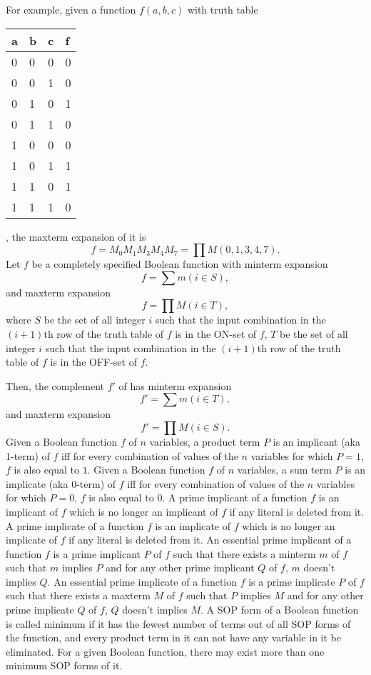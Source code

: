 \documentclass[a4paper,12pt]{article}
\begin{document}
\begin{itemize}
\begin{itemize}
\begin{itemize}
\begin{itemize}
\begin{itemize}
\begin{itemize}
\begin{itemize}
For example, given a function $f(a,b,c)$ with truth table
\begin{longtable}[c]{|m|m|m|m|}
\hline
a & b & c & f\\\hline
0 & 0 & 0 & 0\\\hline
0 & 0 & 1 & 0\\\hline
0 & 1 & 0 & 1\\\hline
0 & 1 & 1 & 0\\\hline
1 & 0 & 0 & 0\\\hline
1 & 0 & 1 & 1\\\hline
1 & 1 & 0 & 1\\\hline
1 & 1 & 1 & 0\\\hline
\end{longtable}
, the maxterm expansion of it is
\[f=M_0M_1M_3M_4M_7=\prod M(0,1,3,4,7).\]
Let $f$ be a completely specified Boolean function with minterm expansion
\[f=\sum m(i\in S),\]
and maxterm expansion
\[f=\prod M(i\in T),\]
where $S$ be the set of all integer $i$ such that the input combination in the $(i+1)$th row of the truth table of $f$ is in the ON-set of $f$, $T$ be the set of all integer $i$ such that the input combination in the $(i+1)$th row of the truth table of $f$ is in the OFF-set of $f$.

Then, the complement $f'$ of has minterm expansion 
\[f'=\sum m(i\in T),\]
and maxterm expansion
\[f'=\prod M(i\in S).\]
Given a Boolean function $f$ of $n$ variables, a product term $P$ is an implicant (aka 1-term) of $f$ iff for every combination of values of the $n$ variables for which $P = 1$, $f$ is also equal to $1$.
Given a Boolean function $f$ of $n$ variables, a sum term $P$ is an implicate (aka 0-term) of $f$ iff for every combination of values of the $n$ variables for which $P = 0$, $f$ is also equal to $0$.
A prime implicant of a function $f$ is an implicant of $f$ which is no longer an implicant of $f$ if any literal is deleted from it.
A prime implicate of a function $f$ is an implicate of $f$ which is no longer an implicate of $f$ if any literal is deleted from it.
An essential prime implicant of a function $f$ is a prime implicant $P$ of $f$ such that there exists a minterm $m$ of $f$ such that $m$ implies $P$ and for any other prime implicant $Q$ of $f$, $m$ doesn't implies $Q$.
An essential prime implicate of a function $f$ is a prime implicate $P$ of $f$ such that there exists a maxterm $M$ of $f$ such that $P$ implies $M$ and for any other prime implicate $Q$ of $f$, $Q$ doesn't implies $M$.
A SOP form of a Boolean function is called minimum if it has the fewest number of terms out of all SOP forms of the function, and every product term in it can not have any variable in it be eliminated. For a given Boolean function, there may exist more than one minimum SOP forms of it.


\end{itemize}
\end{itemize}
\end{itemize}
\end{itemize}
\end{itemize}
\end{itemize}
\end{itemize}
\end{document}
